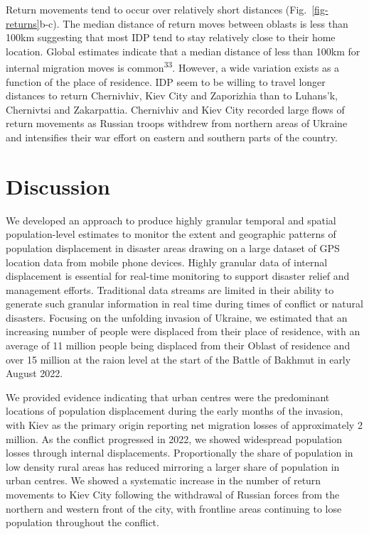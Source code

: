 \documentclass[
  11pt,
]{article}
\begin{document}
Return movements tend to occur over relatively short distances
(Fig.~\ref{fig-returns}b-c). The median distance of return moves between
oblasts is less than 100km suggesting that most IDP tend to stay
relatively close to their home location. Global estimates indicate that
a median distance of less than 100km for internal migration moves is
common\textsuperscript{33}. However, a wide variation exists as a
function of the place of residence. IDP seem to be willing to travel
longer distances to return Chernivhiv, Kiev City and Zaporizhia than to
Luhans'k, Chernivtsi and Zakarpattia. Chernivhiv and Kiev City recorded
large flows of return movements as Russian troops withdrew from northern
areas of Ukraine and intensifies their war effort on eastern and
southern parts of the country.

\section{Discussion}\label{discussion}

We developed an approach to produce highly granular temporal and spatial
population-level estimates to monitor the extent and geographic patterns
of population displacement in disaster areas drawing on a large dataset
of GPS location data from mobile phone devices. Highly granular data of
internal displacement is essential for real-time monitoring to support
disaster relief and management efforts. Traditional data streams are
limited in their ability to generate such granular information in real
time during times of conflict or natural disasters. Focusing on the
unfolding invasion of Ukraine, we estimated that an increasing number of
people were displaced from their place of residence, with an average of
11 million people being displaced from their Oblast of residence and
over 15 million at the raion level at the start of the Battle of Bakhmut
in early August 2022.

We provided evidence indicating that urban centres were the predominant
locations of population displacement during the early months of the
invasion, with Kiev as the primary origin reporting net migration losses
of approximately 2 million. As the conflict progressed in 2022, we
showed widespread population losses through internal displacements.
Proportionally the share of population in low density rural areas has
reduced mirroring a larger share of population in urban centres. We
showed a systematic increase in the number of return movements to Kiev
City following the withdrawal of Russian forces from the northern and
western front of the city, with frontline areas continuing to lose
population throughout the conflict.
\end{document}
